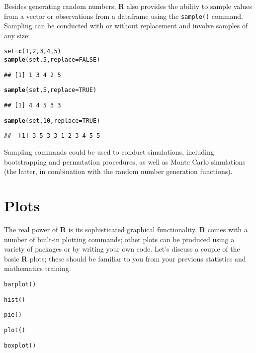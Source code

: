 \documentclass[12pt]{article}\usepackage[]{graphicx}\usepackage[]{color}
\makeatletter
\newcommand{\hlnum}[1]{\textcolor[rgb]{0.686,0.059,0.569}{#1}}%
\newcommand{\hlstd}[1]{\textcolor[rgb]{0.345,0.345,0.345}{#1}}%
\newcommand{\hlkwb}[1]{\textcolor[rgb]{0.69,0.353,0.396}{#1}}%
\newcommand{\hlkwc}[1]{\textcolor[rgb]{0.333,0.667,0.333}{#1}}%
\newcommand{\hlkwd}[1]{\textcolor[rgb]{0.737,0.353,0.396}{\textbf{#1}}}%
\newenvironment{kframe}{%
 \def\at@end@of@kframe{}%
 \ifinner\ifhmode%
  \def\at@end@of@kframe{\end{minipage}}%
  \begin{minipage}{\columnwidth}%
 \fi\fi%
 \def\FrameCommand##1{\hskip\@totalleftmargin \hskip-\fboxsep
 \colorbox{shadecolor}{##1}\hskip-\fboxsep
     \hskip-\linewidth \hskip-\@totalleftmargin \hskip\columnwidth}%
 \MakeFramed {\advance\hsize-\width
   \@totalleftmargin\z@ \linewidth\hsize
   \@setminipage}}%
 {\par\unskip\endMakeFramed%
 \at@end@of@kframe}
\newenvironment{knitrout}{}{} %
\makeatother
\begin{document}
Besides generating random numbers, \textbf{R} also provides the ability to sample values from a vector or observations from a dataframe using the \verb|sample()| command. Sampling can be conducted with or without replacement and involve samples of any size:
\begin{knitrout}
\color{fgcolor}\begin{kframe}
\begin{alltt}
\hlstd{set} \hlkwb{=} \hlkwd{c}\hlstd{(}\hlnum{1}\hlstd{,} \hlnum{2}\hlstd{,} \hlnum{3}\hlstd{,} \hlnum{4}\hlstd{,} \hlnum{5}\hlstd{)}
\hlkwd{sample}\hlstd{(set,} \hlnum{5}\hlstd{,} \hlkwc{replace} \hlstd{=} \hlnum{FALSE}\hlstd{)}
\end{alltt}
\begin{verbatim}
## [1] 1 3 4 2 5
\end{verbatim}
\begin{alltt}
\hlkwd{sample}\hlstd{(set,} \hlnum{5}\hlstd{,} \hlkwc{replace} \hlstd{=} \hlnum{TRUE}\hlstd{)}
\end{alltt}
\begin{verbatim}
## [1] 4 4 5 3 3
\end{verbatim}
\begin{alltt}
\hlkwd{sample}\hlstd{(set,} \hlnum{10}\hlstd{,} \hlkwc{replace} \hlstd{=} \hlnum{TRUE}\hlstd{)}
\end{alltt}
\begin{verbatim}
##  [1] 3 5 3 3 1 2 3 4 5 5
\end{verbatim}
\end{kframe}
\end{knitrout}


Sampling commands could be used to conduct simulations, including bootstrapping and permutation procedures, as well as Monte Carlo simulations (the latter, in combination with the random number generation functions).

\section{Plots}\label{sec:plots}
The real power of \textbf{R} is its sophisticated graphical functionality. \textbf{R} comes with a number of built-in plotting commands; other plots can be produced using a variety of packages or by writing your own code. Let's discuss a couple of the basic \textbf{R} plots; these should be familiar to you from your previous statistics and mathematics training.
\begin{itemize*}
\item \verb|barplot()|
\item \verb|hist()|
\item \verb|pie()|
\item \verb|plot()|
\item \verb|boxplot()|
\end{itemize*}
\end{document}
